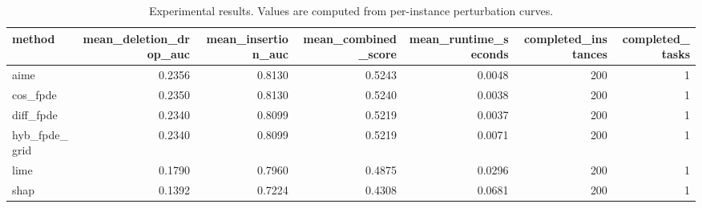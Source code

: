 \begin{table}[t]
\caption{Experimental results. Values are computed from per-instance perturbation curves.}
\label{tab:main_results_computed}
\centering
\begin{tabular}{lrrrrrr}
\toprule
method & mean\_deletion\_drop\_auc & mean\_insertion\_auc & mean\_combined\_score & mean\_runtime\_seconds & completed\_instances & completed\_tasks \\
\midrule
aime & 0.2356 & 0.8130 & 0.5243 & 0.0048 & 200 & 1 \\
cos\_fpde & 0.2350 & 0.8130 & 0.5240 & 0.0038 & 200 & 1 \\
diff\_fpde & 0.2340 & 0.8099 & 0.5219 & 0.0037 & 200 & 1 \\
hyb\_fpde\_grid & 0.2340 & 0.8099 & 0.5219 & 0.0071 & 200 & 1 \\
lime & 0.1790 & 0.7960 & 0.4875 & 0.0296 & 200 & 1 \\
shap & 0.1392 & 0.7224 & 0.4308 & 0.0681 & 200 & 1 \\
\bottomrule
\end{tabular}

\end{table}
